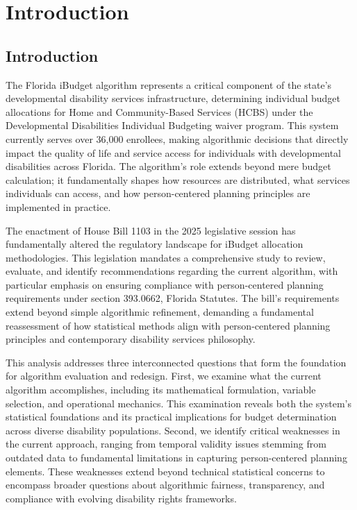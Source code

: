 ﻿%
\chapter{Introduction}  \newpage

\section{Introduction}

The Florida iBudget algorithm represents a critical component of the state's developmental disability services infrastructure, determining individual budget allocations for Home and Community-Based Services (HCBS) under the Developmental Disabilities Individual Budgeting waiver program. This system currently serves over 36,000 enrollees, making algorithmic decisions that directly impact the quality of life and service access for individuals with developmental disabilities across Florida. The algorithm's role extends beyond mere budget calculation; it fundamentally shapes how resources are distributed, what services individuals can access, and how person-centered planning principles are implemented in practice.

The enactment of House Bill 1103 in the 2025 legislative session has fundamentally altered the regulatory landscape for iBudget allocation methodologies. This legislation mandates a comprehensive study to review, evaluate, and identify recommendations regarding the current algorithm, with particular emphasis on ensuring compliance with person-centered planning requirements under section 393.0662, Florida Statutes. The bill's requirements extend beyond simple algorithmic refinement, demanding a fundamental reassessment of how statistical methods align with person-centered planning principles and contemporary disability services philosophy.

This analysis addresses three interconnected questions that form the foundation for algorithm evaluation and redesign. First, we examine what the current algorithm accomplishes, including its mathematical formulation, variable selection, and operational mechanics. This examination reveals both the system's statistical foundations and its practical implications for budget determination across diverse disability populations. Second, we identify critical weaknesses in the current approach, ranging from temporal validity issues stemming from outdated data to fundamental limitations in capturing person-centered planning elements. These weaknesses extend beyond technical statistical concerns to encompass broader questions about algorithmic fairness, transparency, and compliance with evolving disability rights frameworks.

